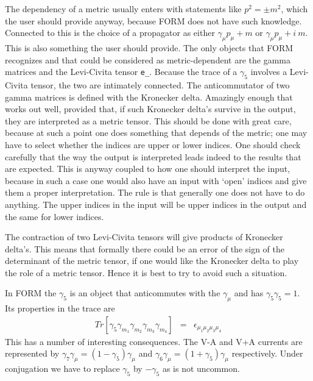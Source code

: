 \noindent The dependency of a metric usually enters with statements like 
$p^2 = \pm m^2$, which the user should provide anyway, because FORM does 
not have such knowledge. Connected to this is the choice of a 
propagator as either $\gamma_\mu p_\mu + m$ or 
$\gamma_\mu p_\mu + i\ m$. This is also something the user should provide. 
The only objects that FORM recognizes and that could be considered as 
metric-dependent are the gamma matrices and the 
Levi-Civita tensor 
\verb:e_:. Because the trace of a $\gamma_5$ involves a Levi-Civita tensor, 
the two are intimately connected. The anticommutator of two gamma matrices 
is defined with the Kronecker delta. Amazingly enough that works out well, 
provided that, if such Kronecker delta's survive in the output, they are 
interpreted as a metric tensor. This should be done with great care, 
because at such a point one does something that depends of the metric; one 
may have to select whether the indices are upper or lower indices. One 
should check carefully that the way the output is interpreted leads indeed 
to the results that are expected. This is anyway coupled to how one should 
interpret the input, because in such a case one would also have an input 
with `open' indices and give them a proper interpretation. The rule is that 
generally one does not have to do anything. The upper indices in the input 
will be upper indices in the output and the same for lower indices. \hfill 
\vspace{2mm}

\noindent The contraction of two Levi-Civita tensors will give products of 
Kronecker delta's. This means that formally there could be an error of the 
sign of the determinant of the metric tensor, if one would like the 
Kronecker delta to play the role of a metric tensor. Hence it is best to 
try to avoid such a situation. \hfill \vspace{2mm}

\noindent In FORM the $\gamma_5$ is an object that anticommutes with 
the $\gamma_\mu$ and has $\gamma_5\gamma_5 = 1$. Its properties 
in the trace are 
\begin{eqnarray}
	Tr[\gamma_5\gamma_{m_1}\gamma_{m_2}\gamma_{m_3}\gamma_{m_4}] & = &
		\epsilon_{\mu_1\mu_2\mu_3\mu_4} \nonumber
\end{eqnarray}
This has a number of interesting consequences. The V-A and V+A currents are 
represented by $\gamma_7\gamma_\mu = (1-\gamma_5)\gamma_\mu$ and 
$\gamma_6\gamma_\mu = (1+\gamma_5)\gamma_\mu$ respectively. Under 
conjugation we have to replace $\gamma_5$ by $-\gamma_5$ as is not 
uncommon. \hfill \vspace{2mm}

